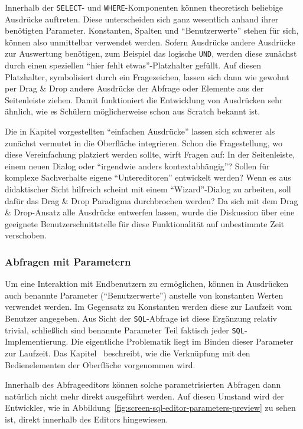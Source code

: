 Innerhalb der \texttt{SELECT}- und \texttt{WHERE}-Komponenten können theoretisch beliebige Ausdrücke auftreten. Diese unterscheiden sich ganz wesentlich anhand ihrer benötigten Parameter. Konstanten, Spalten und "`Benutzerwerte"' stehen für sich, können also unmittelbar verwendet werden. Sofern Ausdrücke andere Ausdrücke zur Auswertung benötigen, zum Beispiel das logische \texttt{UND}, werden diese zunächst durch einen speziellen "`hier fehlt etwas"'-Platzhalter gefüllt. Auf diesen Platzhalter, symbolisiert durch ein Fragezeichen, lassen sich dann wie gewohnt per Drag \& Drop andere Ausdrücke der Abfrage oder Elemente aus der Seitenleiste ziehen. Damit funktioniert die Entwicklung von Ausdrücken sehr ähnlich, wie es Schülern möglicherweise schon aus Scratch bekannt ist.

Die in Kapitel  vorgestellten "`einfachen Ausdrücke"' lassen sich schwerer als zunächst vermutet in die Oberfläche integrieren. Schon die Fragestellung, wo diese Vereinfachung platziert werden sollte, wirft Fragen auf: In der Seitenleiste, einem neuen Dialog oder "`irgendwie anders kontextabhängig"'? Sollen für komplexe Sachverhalte eigene "`Untereditoren"' entwickelt werden? Wenn es aus didaktischer Sicht hilfreich scheint mit einem "`Wizard"'-Dialog zu arbeiten, soll dafür das Drag \& Drop Paradigma durchbrochen werden? Da sich mit dem Drag \& Drop-Ansatz alle Ausdrücke entwerfen lassen, wurde die Diskussion über eine geeignete Benutzerschnittstelle für diese Funktionalität auf unbestimmte Zeit verschoben.

\subsubsection{Abfragen mit Parametern}
\label{sec:design-query-params}

Um eine Interaktion mit Endbenutzern zu ermöglichen, können in Ausdrücken auch benannte Parameter ("`Benutzerwerte"') anstelle von konstanten Werten verwendet werden. Im Gegensatz zu Konstanten werden diese zur Laufzeit vom Benutzer angegeben. Aus Sicht der \texttt{SQL}-Abfrage ist diese Ergänzung relativ trivial, schließlich sind benannte Parameter Teil faktisch jeder \texttt{SQL}-Implementierung. Die eigentliche Problematik liegt im Binden dieser Parameter zur Laufzeit. Das Kapitel~ beschreibt, wie die Verknüpfung mit den Bedienelementen der Oberfläche vorgenommen wird.

Innerhalb des Abfrageeditors können solche parametrisierten Abfragen dann natürlich nicht mehr direkt ausgeführt werden. Auf diesen Umstand wird der Entwickler, wie in Abbildung~\ref{fig:screen-sql-editor-parameters-preview} zu sehen ist, direkt innerhalb des Editors hingewiesen.

